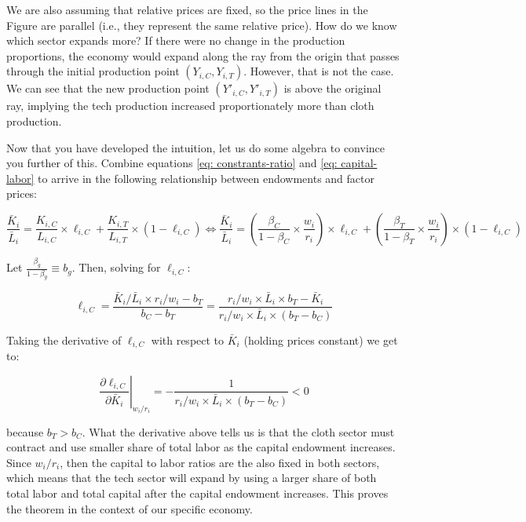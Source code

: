 \documentclass[11pt,letterpaper]{article}
\begin{document}
We are also assuming that relative prices are fixed, so the price lines in the Figure are parallel (i.e., they represent the same relative price). How do we know which sector expands more? If there were no change in the production proportions, the economy would expand along the ray from the origin that passes through the initial production point $(Y_{i,C},Y_{i,T})$. However, that is not the case. We can see that the new production point  $(Y'_{i,C},Y'_{i,T})$ is above the original ray, implying the tech production increased proportionately more than cloth production.

Now that you have developed the intuition, let us do some algebra to convince you further of this. Combine equations \eqref{eq: constrants-ratio} and \eqref{eq: capital-labor} to arrive in the following relationship between endowments and factor prices:

\begin{equation*}
\frac{\bar{K}_i}{\bar{L}_i} = \frac{K_{i,C}}{L_{i,C}} \times \ell_{i,C} + \frac{K_{i,T}}{L_{i,T}} \times (1-\ell_{i,C}) \iff \frac{\bar{K}_i}{\bar{L}_i}= \left( \frac{\beta_C}{1-\beta_C} \times \frac{w_i}{r_i} \right)  \times \ell_{i,C}  + \left( \frac{\beta_T}{1-\beta_T} \times \frac{w_i}{r_i} \right)  \times (1-\ell_{i,C})  
\end{equation*}

Let $\frac{\beta_g}{1-\beta_g} \equiv b_g$. Then, solving for $\ell_{i,C}$:

\begin{equation*}
    \ell_{i,C} = \frac{ \bar{K}_i/\bar{L}_i \times r_i /w_i - b_T}{b_C - b_T} = \frac{ r_i /w_i \times\bar{L}_i \times  b_T-  \bar{K}_i }{r_i /w_i \times\bar{L}_i\times(b_T - b_C)}
\end{equation*}

Taking the derivative of $\ell_{i,C}$ with respect to $\bar{K}_i$ (holding prices constant) we get to:

\begin{equation*}
    \left. \frac{\partial  \ell_{i,C}}{\partial \bar{K}_i} \right|_{w_i / r_i} = - \frac{ 
    1}{r_i /w_i \times\bar{L}_i\times(b_T - b_C)} < 0
\end{equation*}

\noindent because $b_T > b_C$. What the derivative above tells us is that the cloth sector must contract and use smaller share of total labor as the capital endowment increases. Since $w_i / r_i$, then the capital to labor ratios are the also fixed in both sectors, which means that the tech sector will expand by using a larger share of both total labor and total capital after the capital endowment increases. This proves the theorem in the context of our specific economy.
\end{document}

